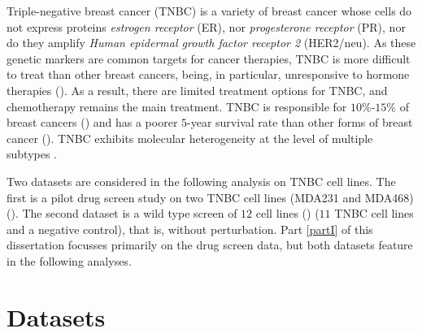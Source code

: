 Triple-negative breast cancer (TNBC) is a variety of breast cancer whose cells do not express proteins \emph{estrogen receptor} (ER), nor \emph{progesterone receptor} (PR), nor do they amplify \emph{Human epidermal growth factor receptor 2} (HER2/neu). As these genetic markers are common targets for cancer therapies, TNBC is more difficult to treat than other breast cancers, being, in particular, unresponsive to hormone therapies (\cite{hudis2011triple}). As a result, there are limited treatment options for TNBC, and chemotherapy remains the main treatment. TNBC is responsible for $10\%$-$15\%$ of breast cancers (\cite{chavez2010triple}) and has a poorer $5$-year survival rate than other forms of breast cancer (\cite{gonccalves2018survival}). TNBC exhibits molecular heterogeneity at the level of multiple subtypes \cite{hatem2016targeting}.


Two datasets are considered in the following analysis on TNBC cell lines. The first is a pilot drug screen study on two TNBC cell lines (MDA231 and MDA468) (\cite{filmus1985mda}). The second dataset is a wild type screen of $12$ cell lines (\cite{chavez2010triple}) ($11$ TNBC cell lines and a negative control), that is, without perturbation. Part \ref{partI} of this dissertation focusses primarily on the drug screen data, but both datasets feature in the following analyses.

\section{Datasets}


